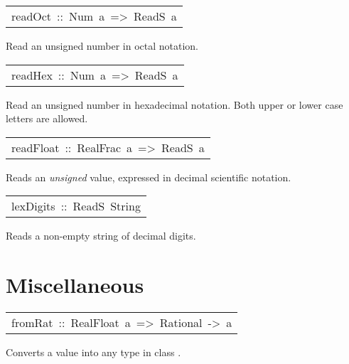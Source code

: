 \begin{haddockdesc}
\item[\begin{tabular}{@{}l}
readOct\ ::\ Num\ a\ =>\ ReadS\ a
\end{tabular}]\haddockbegindoc
Read an unsigned number in octal notation.
\par

\end{haddockdesc}
\begin{haddockdesc}
\item[\begin{tabular}{@{}l}
readHex\ ::\ Num\ a\ =>\ ReadS\ a
\end{tabular}]\haddockbegindoc
Read an unsigned number in hexadecimal notation.
 Both upper or lower case letters are allowed.
\par

\end{haddockdesc}
\begin{haddockdesc}
\item[\begin{tabular}{@{}l}
readFloat\ ::\ RealFrac\ a\ =>\ ReadS\ a
\end{tabular}]\haddockbegindoc
Reads an \emph{unsigned}  value,
 expressed in decimal scientific notation.
\par

\end{haddockdesc}
\begin{haddockdesc}
\item[\begin{tabular}{@{}l}
lexDigits\ ::\ ReadS\ String
\end{tabular}]\haddockbegindoc
Reads a non-empty string of decimal digits.
\par

\end{haddockdesc}
\section{Miscellaneous
}
\begin{haddockdesc}
\item[\begin{tabular}{@{}l}
fromRat\ ::\ RealFloat\ a\ =>\ Rational\ ->\ a
\end{tabular}]\haddockbegindoc
Converts a  value into any type in class .
\par

\end{haddockdesc}